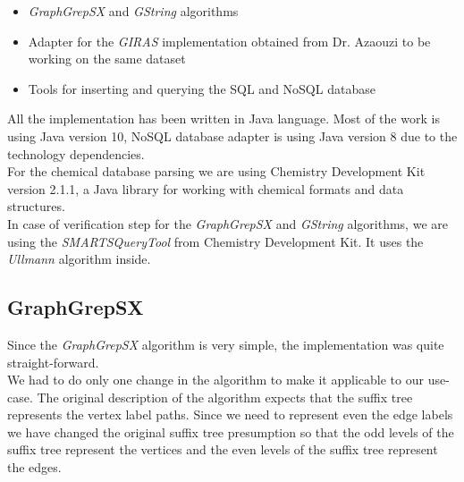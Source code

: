 \begin{itemize}
	\item \textit{GraphGrepSX} and \textit{GString} algorithms
	
	\item Adapter for the \textit{GIRAS} implementation obtained from Dr. Azaouzi to be working on the same dataset
	
	\item Tools for inserting and querying the SQL and NoSQL database
\end{itemize}

All the implementation has been written in Java language\cite{java}. Most of the work is using Java version 10, NoSQL database adapter is using Java version 8 due to the technology dependencies.\\

For the chemical database parsing we are using Chemistry Development \break Kit\cite{CDK} version 2.1.1, a Java library for working with chemical formats and data structures.\\

In case of verification step for the \textit{GraphGrepSX} and \textit{GString} algorithms, we are using the \textit{SMARTSQueryTool} from Chemistry Development Kit. It uses the \textit{Ullmann}\cite{Ullmann} algorithm inside.

\subsection{GraphGrepSX} \label{graphgrep-implementation}

Since the \textit{GraphGrepSX} algorithm is very simple, the implementation was quite straight-forward.\\

We had to do only one change in the algorithm to make it applicable to our use-case. The original description of the algorithm expects that the suffix tree represents the vertex label paths. Since we need to represent even the edge labels we have changed the original suffix tree presumption so that the odd levels of the suffix tree represent the vertices and the even levels of the suffix tree represent the edges.\\


